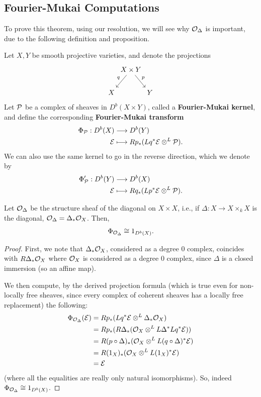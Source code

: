 \documentclass[12pt]{article}
\begin{document}
\subsection{Fourier-Mukai Computations}
To prove this theorem, using our resolution, we will see why $\mathcal{O}_\Delta$ is important, due to the following definition and proposition.

\begin{defn}
    Let $X,Y$ be smooth projective varieties, and denote the projections
    \[\begin{tikzcd}[column sep=0cm]
        & X\times Y \ar[dl,"q"'] \ar[dr,"p"] &\\
        X & & Y
    \end{tikzcd}\]
    Let $\mathcal{P}$ be a complex of sheaves in $D^b(X\times Y)$, called a \textbf{Fourier-Mukai kernel}, and define the corresponding \textbf{Fourier-Mukai transform}
    \begin{align*}
        \Phi_{\mathcal{P}}: D^b(X) &\longrightarrow D^b(Y)\\
        \mathcal{E} &\longmapsto Rp_*(Lq^*\mathcal{E} \otimes^L \mathcal{P}).
    \end{align*}
    We can also use the same kernel to go in the reverse direction, which we denote by
    \begin{align*}
        \Phi_{\mathcal{P}}': D^b(Y) &\longrightarrow D^b(X)\\
        \mathcal{E} &\longmapsto Rq_*(Lp^*\mathcal{E} \otimes^L \mathcal{P}).
    \end{align*}
\end{defn}

\begin{prop}
    Let $\mathcal{O}_{\Delta}$ be the structure sheaf of the diagonal on $X\times X$, i.e., if $\Delta: X\to X\times_k X$ is the diagonal, $\mathcal{O}_{\Delta} = \Delta_* \mathcal{O}_X$. Then,
    \[\Phi_{\mathcal{O}_\Delta} \cong 1_{D^b(X)}.\]
\end{prop}

\begin{proof}
    First, we note that $\Delta_*\mathcal{O}_X$, considered as a degree 0 complex, coincides with $R\Delta_* \mathcal{O}_X$ where $\mathcal{O}_X$ is considered as a degree 0 complex, since $\Delta$ is a closed immersion (so an affine map).
    
    We then compute, by the derived projection formula (which is true even for non-locally free sheaves, since every complex of coherent sheaves has a locally free replacement) the following:
    \begin{align*}
        \Phi_{\mathcal{O}_\Delta}(\mathcal{E}) &= Rp_*(Lq^*\mathcal{E} \otimes^L \Delta_* \mathcal{O}_X)\\
        &= Rp_*(R\Delta_*(\mathcal{O}_X \otimes^L L\Delta^*Lq^* \mathcal{E}))\\
        &= R(p \circ \Delta)_*(\mathcal{O}_X \otimes^L L(q\circ \Delta)^* \mathcal{E})\\
        &= R(1_X)_*(\mathcal{O}_X \otimes^L L(1_X)^* \mathcal{E})\\
        &= \mathcal{E}
    \end{align*}
    (where all the equalities are really only natural isomorphisms). So, indeed $\Phi_{\mathcal{O}_\Delta} \cong 1_{D^b(X)}$.
\end{proof}
\end{document}
